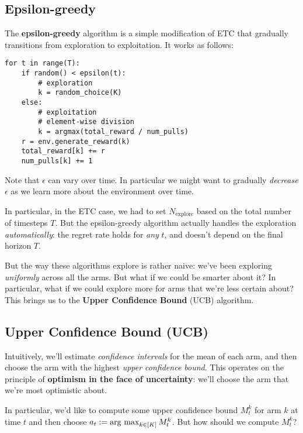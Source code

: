 \documentclass[../main/main]{subfiles}
\begin{document}
\subsection{Epsilon-greedy}

The \textbf{epsilon-greedy} algorithm is a simple modification of ETC that gradually transitions from exploration to exploitation. It works as follows:

\begin{lstlisting}
for t in range(T):
    if random() < epsilon(t):
        # exploration
        k = random_choice(K)
    else:
        # exploitation
        # element-wise division
        k = argmax(total_reward / num_pulls)
    r = env.generate_reward(k)
    total_reward[k] += r
    num_pulls[k] += 1
\end{lstlisting}

Note that $\epsilon$ can vary over time. In particular we might want to gradually \emph{decrease} $\epsilon$ as we learn more about the environment over time.


In particular, in the ETC case, we had to set $N_{\text{explore}}$ based on the total number of timesteps $T$. But the epsilon-greedy algorithm actually handles the exploration \emph{automatically}: the regret rate holds for \emph{any} $t$, and doesn't depend on the final horizon $T$.

But the way these algorithms explore is rather naive: we've been exploring \emph{uniformly} across all the arms. But what if we could be smarter about it? In particular, what if we could explore more for arms that we're less certain about? This brings us to the \textbf{Upper Confidence Bound} (UCB) algorithm.


\subsection{Upper Confidence Bound (UCB)}


Intuitively, we'll estimate \emph{confidence intervals} for the mean of each arm, and then choose the arm with the highest \emph{upper confidence bound}. This operates on the principle of \textbf{optimism in the face of uncertainty}: we'll choose the arm that we're most optimistic about.

In particular, we'd like to compute some upper confidence bound $M^k_t$ for arm $k$ at time $t$ and then choose $a_t := \operatorname*{\textrm{arg\ max}}_{k \in [K]} M^k_t$. But how should we compute $M^k_t$?
\end{document}
